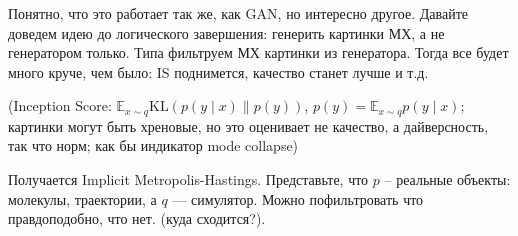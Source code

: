 \documentclass{minimal}
\begin{document}
Понятно, что это работает так же, как GAN, но интересно другое. Давайте доведем идею до логического завершения: генерить картинки МХ, а не генератором только. Типа фильтруем МХ картинки из генератора. Тогда все будет много круче, чем было: IS поднимется, качество станет лучше и т.д.

(Inception Score:  $\mathbb{E}_{x\sim q}\mathrm{KL}(p(y\mid x)\|p(y))$, $p(y)=\mathbb{E}_{x\sim q} p(y\mid x)$; картинки могут быть хреновые, но это оценивает не качество, а дайверсность, так что норм; как бы индикатор mode collapse)

Получается Implicit Metropolis-Hastings. Представьте, что $p$ -- реальные объекты: молекулы, траектории, а $q$ --- симулятор. Можно пофильтровать что правдоподобно, что нет. (куда сходится?).
\end{document}
